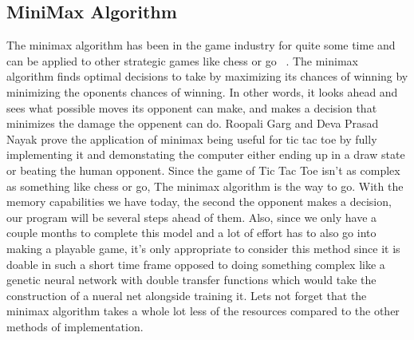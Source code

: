 \documentclass[letterpaper]{article}
\begin{document}
\subsection{MiniMax Algorithm}
The minimax algorithm has been in the game industry for quite some time and can be applied to other strategic games like chess or go ~\cite {inproceedings}. The minimax algorithm finds optimal decisions to take by maximizing its chances of winning by minimizing the oponents chances of winning. In other words, it looks ahead and sees what possible moves its opponent can make, and makes a decision that minimizes the damage the oppenent can do. Roopali Garg and Deva Prasad Nayak prove the application of minimax being useful for tic tac toe by fully implementing it and demonstating the computer either ending up in a draw state or beating the human opponent. Since the game of Tic Tac Toe isn’t as complex as something like chess or go,  The minimax algorithm is the way to go. With the memory capabilities we have today, the second the opponent makes a decision, our program will be several steps ahead of them. Also, since we only have a couple months to complete this model and a lot of effort has to also go into making a playable game, it’s only appropriate to consider this method since it is doable in such a short time frame opposed to doing something complex like a genetic neural network with double transfer functions which would take the construction of a nueral net alongside training it. Lets not forget that the minimax algorithm takes a whole lot less of the resources compared to the other methods of implementation.   
\end{document}
